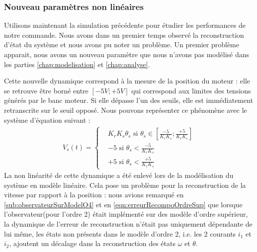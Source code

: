 		\subsubsection{Nouveau paramètres non linéaires}
		Utilisons maintenant la simulation précédente pour étudier les performances de notre commande. Nous avons dans un premier temps observé la reconstruction d'état du système et nous avons pu noter un problème. Un premier problème apparait, nous avons un nouveau paramètre que nous n'avons pas modélisé dans les parties \ref{chap:modelisation} et \ref{chap:analyse}. 
		
			
		Cette nouvelle dynamique correspond à la mesure de la position du moteur : elle se retrouve être borné entre $[-5V; +5V]$ qui correspond aux limites des tensions générés par le banc moteur. Si elle dépasse l'un des seuils, elle est immédiatement retranscrite sur le seuil opposé. Nous pouvons représenter ce phénomène avec le système d'équation suivant :
		\begin{align*}
		V_s(t) = \left\lbrace \begin{aligned}
		&K_rK_s\theta_s \text{ si } \theta_s \in \left[\frac{-5}{K_rK_s}; \frac{+5}{K_rK_s}\right]\\
		&-5 \text{ si } \theta_s < \frac{-5}{K_rK_s}\\
		&+5 \text{ si } \theta_s < \frac{+5}{K_rK_s}
		\end{aligned}
		\right.		
		\end{align*}
		La non linéarité de cette dynamique a été enlevé lors de la modélisation du système en modèle linéaire. Cela pose un problème pour la reconstruction de la vitesse par rapport à la position : nous avions remarqué en \ref{sub:observateurSurModelO4} et en \ref{eqn:erreurRecompoOrdreSup} que lorsque l'observateur(pour l'ordre 2) était implémenté sur des modèle d'ordre supérieur, la dynamique de l'erreur de reconstruction n'était pas uniquement dépendante de lui même, les états non présents dans le modèle d'ordre 2, i.e. les 2 courants $i_1$ et $i_2$, ajoutent un décalage dans la reconstruction des états $\omega$ et $\theta$.
		
